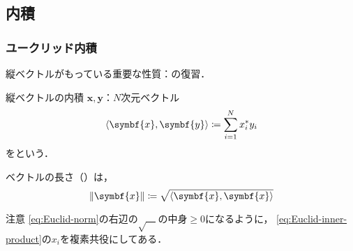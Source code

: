 \documentclass[
    10pt,
    ]{sotsu-beamer}
\begin{document}
\subsection{内積}

\begin{frame}
    \frametitle{ユークリッド内積}

    縦ベクトルがもっている重要な性質：の復習．

    \begin{block}{縦ベクトルの内積}
        $\symbf{x}, \symbf{y}$：$N$次元ベクトル
        \begin{equation}
            \label{eq:Euclid-inner-product}
            \iparen{\symbf{x}, \symbf{y}}
                \coloneq \sum_{i=1}^{N} x_i^* y_i
        \end{equation}
        をという．
    \end{block}

    ベクトルの長さ（）は，
    \begin{equation}
        \label{eq:Euclid-norm}
        \norm{\symbf{x}} \coloneq \sqrt{\iparen{\symbf{x}, \symbf{x}}}
    \end{equation}

    \begin{alertblock}{注意}
        \eqref{eq:Euclid-norm}の右辺の$\sqrt{\quad}$の中身$\geq 0$になるように，
        \eqref{eq:Euclid-inner-product}の$x_i$を複素共役にしてある．
    \end{alertblock}

\end{frame}
\end{document}
